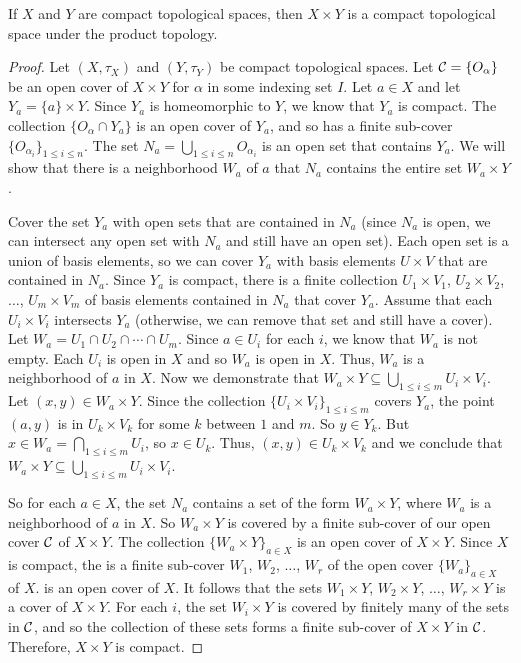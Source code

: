 \begin{theorem} \label{thm:compact_product} If $X$ and $Y$ are compact topological spaces, then $X \times Y$ is a compact topological space under the product topology.
\end{theorem}
 
\begin{proof} Let $(X, \tau_X)$ and $(Y, \tau_Y)$ be compact topological spaces. Let $\mathcal{C} = \{O_{\alpha}\}$ be an open cover of $X \times Y$ for $\alpha$ in some indexing set $I$. Let $a \in X$ and let $Y_a = \{a\} \times Y$. Since $Y_a$ is homeomorphic to $Y$, we know that $Y_a$ is compact. The collection $\{O_{\alpha} \cap Y_a\}$ is an open cover of $Y_a$, and so has a finite sub-cover $\{O_{\alpha_i}\}_{1 \leq i \leq n}$. The set $N_a = \bigcup_{1 \leq i \leq n} O_{\alpha_i}$ is an open set that contains $Y_a$. We will show that there is a neighborhood $W_a$ of $a$ that $N_a$ contains the entire set $W_a \times Y$. 

Cover the set $Y_a$ with open sets that are contained in $N_a$ (since $N_a$ is open, we can intersect any open set with $N_a$ and still have an open set). Each open set is a union of basis elements, so we can cover $Y_a$ with basis elements $U \times V$ that are contained in $N_a$. Since $Y_a$ is compact, there is a finite collection $U_1 \times V_1$, $U_2 \times V_2$, $\ldots$, $U_m \times V_m$ of basis elements contained in $N_a$ that cover $Y_a$. Assume that each $U_i \times V_i$ intersects $Y_a$ (otherwise, we can remove that set and still have a cover). Let $W_a = U_1 \cap U_2 \cap \cdots \cap U_m$.  Since $a \in U_i$ for each $i$, we know that $W_a$ is not empty. Each $U_i$ is open in $X$ and so $W_a$ is open in $X$. Thus, $W_a$ is a neighborhood of $a$ in $X$. Now we demonstrate that $W_a \times Y \subseteq \bigcup_{1 \leq i \leq m} U_i \times V_i$. Let $(x,y) \in W_a \times Y$. Since the collection $\{U_i \times V_i\}_{1 \leq i \leq m}$ covers $Y_a$, the point $(a,y)$ is in $U_k \times V_k$ for some $k$ between $1$ and $m$. So $y \in Y_k$.  But $x \in W_a = \bigcap_{1 \leq i \leq m} U_i$, so $x \in U_k$. Thus, $(x,y) \in U_k \times V_k$ and we conclude that $W_a \times Y \subseteq \bigcup_{1 \leq i \leq m} U_i \times V_i$.

So for each $a \in X$, the set $N_a$ contains a set of the form $W_a \times Y$, where $W_a$ is a neighborhood of $a$ in $X$. So $W_a \times Y$ is covered by a finite sub-cover of our open cover $\mathcal{C}$ of $X \times Y$. The collection $\{W_a \times Y\}_{a \in X}$ is an open cover of $X \times Y$. Since $X$ is compact, the is a finite sub-cover $W_1$, $W_2$, $\ldots$, $W_r$ of the open cover $\{W_a\}_{a \in X}$ of $X$. is an open cover of $X$. It follows that the sets $W_1 \times Y$, $W_2 \times Y$, $\ldots$, $W_r \times Y$ is a cover of $X \times Y$. For each $i$, the set $W_i \times Y$ is covered by finitely many of the sets in $\mathcal{C}$, and so the collection of these sets forms a finite sub-cover of $X \times Y$ in $\mathcal{C}$. Therefore, $X \times Y$ is compact. 
\end{proof}

